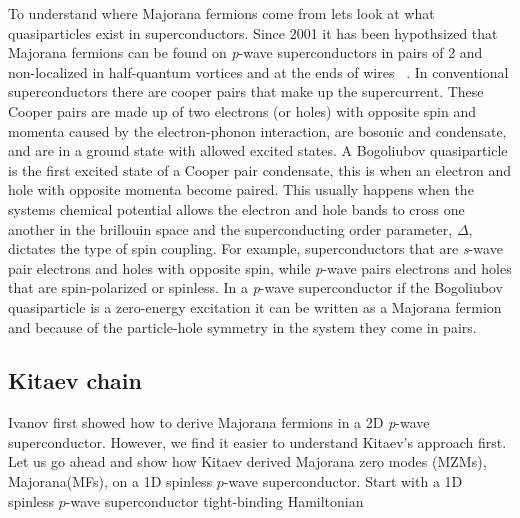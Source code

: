 To understand where Majorana fermions come from lets look at what quasiparticles exist in superconductors.
Since 2001 it has been hypothsized that Majorana fermions can be found on \textit{p}-wave superconductors in pairs of 2 and non-localized in half-quantum vortices and at the ends of wires  ~\cite{ivanovNonAbelianStatisticsHalfQuantum2001, kitaevUnpairedMajoranaFermions2001}.
In conventional superconductors there are cooper pairs that make up the supercurrent.
These Cooper pairs are made up of two electrons (or holes) with opposite spin and momenta caused by the electron-phonon interaction, are bosonic and condensate, and are in a ground state with allowed excited states.
A Bogoliubov quasiparticle is the first excited state of a Cooper pair condensate, this is when an electron and hole with opposite momenta become paired.
This usually happens when the systems chemical potential allows the electron and hole bands to cross one another in the brillouin space and the superconducting order parameter, $\Delta$, dictates the type of spin coupling.
For example, superconductors that are \textit{s}-wave pair electrons and holes with opposite spin, while \textit{p}-wave pairs electrons and holes that are spin-polarized or spinless.
In a \textit{p}-wave superconductor if the Bogoliubov quasiparticle is a zero-energy excitation it can be written as a Majorana fermion and because of the particle-hole symmetry in the system they come in pairs.


\subsection{Kitaev chain}
Ivanov first showed how to derive Majorana fermions in a 2D \textit{p}-wave superconductor.
However, we find it easier to understand Kitaev's approach first.
Let us go ahead and show how Kitaev derived Majorana zero modes (MZMs), Majorana(MFs), on a 1D spinless $p$-wave superconductor.
Start with a 1D spinless $p$-wave superconductor tight-binding Hamiltonian

